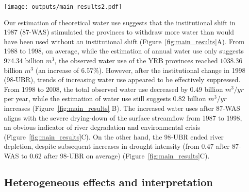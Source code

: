 \documentclass[default, sn-standardnature]{sn-jnl}
\begin{document}
\begin{figure*}[!htb]
	\centering
	\texttt{[image: outputs/main\_results2.pdf]}
	\caption{
		Effects of two institutional shifts on water resources use and allocation in the Yellow River Basin (YRB).
		\textbf{A.} water uses of the YRB before and after the institutional shift in 1987 (87-WAS);
		\textbf{B.} water uses of the YRB before and after the institutional shift in 1998 (98-UBR). Blue lines are statistics derived from water use data; grey lines are estimates from the Differenced Synthetic Control method with economic and environmental background controlled;
		\textbf{C.} Drought intensity in the YRB and drying up events of the Yellow River. The size of the grey bubbles denotes the length of drying upstream.
	}
	\label{fig:main_results}
\end{figure*}


\label{result-1-p2}
Our estimation of theoretical water use suggests that the institutional shift in 1987 (87-WAS) stimulated the provinces to withdraw more water than would have been used without an institutional shift (Figure~\ref{fig:main_results}A).
From 1988 to 1998, on average, while the estimation of annual water use only suggests $974.34$ billion $m^3$, the observed water use of the YRB provinces reached $1038.36$ billion $m^3$ (an increase of $6.57\%$).
However, after the institutional change in 1998 (98-UBR), trends of increasing water use appeared to be effectively suppressed. From 1998 to 2008, the total observed water use decreased by $0.49$ billion $m^3/yr$ per year, while the estimation of water use still suggests $0.82$ billion $m^3/yr$ increases (Figure~\ref{fig:main_results} B).
The increased water uses after 87-WAS aligns with the severe drying-down of the surface streamflow from 1987 to 1998, an obvious indicator of river degradation and environmental crisis (Figure~\ref{fig:main_results}C).
On the other hand, the 98-UBR ended river depletion, despite subsequent increases in drought intensity (from $0.47$ after 87-WAS to $0.62$ after 98-UBR on average) (Figure~\ref{fig:main_results}C).



\subsection{Heterogeneous effects and interpretation}
\label{result-3}
\end{document}

